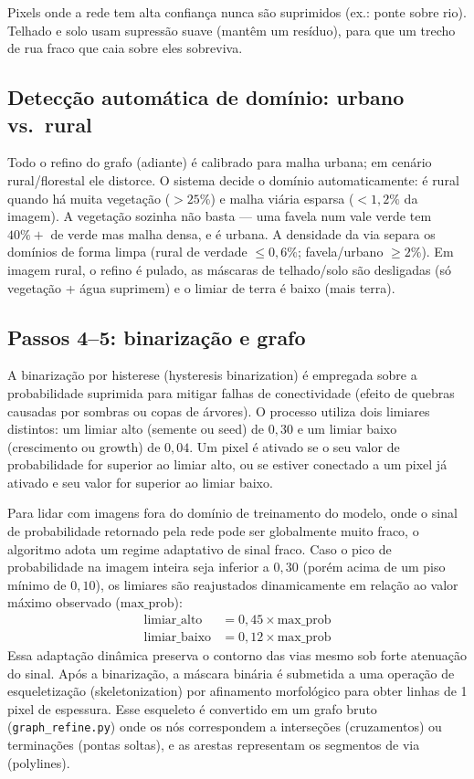 \documentclass[12pt]{article}
\begin{document}
Pixels onde a rede tem alta confiança nunca são suprimidos (ex.: ponte sobre rio). Telhado e solo usam supressão suave (mantêm um resíduo), para que um trecho de rua fraco que caia sobre eles sobreviva.

\subsection{Detecção automática de domínio: urbano vs.\ rural}

Todo o refino do grafo (adiante) é calibrado para malha urbana; em
cenário rural/florestal ele distorce. O sistema decide o domínio
automaticamente: é rural quando há muita vegetação ($>25\%$)
e malha viária esparsa ($<1{,}2\%$ da imagem). A vegetação sozinha não basta
--- uma favela num vale verde tem $40\%+$ de verde mas malha
densa, e é urbana. A densidade da via separa os domínios de forma
limpa (rural de verdade $\le 0{,}6\%$; favela/urbano $\ge 2\%$). Em imagem
rural, o refino é pulado, as máscaras de telhado/solo são desligadas (só
vegetação + água suprimem) e o limiar de terra é baixo (mais terra).

\subsection{Passos 4--5: binarização e grafo}

A binarização por histerese (hysteresis binarization) é empregada sobre a probabilidade suprimida para mitigar falhas de conectividade (efeito de quebras causadas por sombras ou copas de árvores). O processo utiliza dois limiares distintos: um limiar alto (semente ou seed) de $0{,}30$ e um limiar baixo (crescimento ou growth) de $0{,}04$. Um pixel é ativado se o seu valor de probabilidade for superior ao limiar alto, ou se estiver conectado a um pixel já ativado e seu valor for superior ao limiar baixo.

Para lidar com imagens fora do domínio de treinamento do modelo, onde o sinal de probabilidade retornado pela rede pode ser globalmente muito fraco, o algoritmo adota um regime adaptativo de sinal fraco. Caso o pico de probabilidade na imagem inteira seja inferior a $0{,}30$ (porém acima de um piso mínimo de $0{,}10$), os limiares são reajustados dinamicamente em relação ao valor máximo observado ($\text{max\_prob}$):
\begin{align}
\text{limiar\_alto} &= 0{,}45 \times \text{max\_prob} \\
\text{limiar\_baixo} &= 0{,}12 \times \text{max\_prob}
\end{align}
Essa adaptação dinâmica preserva o contorno das vias mesmo sob forte atenuação do sinal. Após a binarização, a máscara binária é submetida a uma operação de esqueletização (skeletonization) por afinamento morfológico para obter linhas de 1 pixel de espessura. Esse esqueleto é convertido em um grafo bruto (\texttt{graph\_refine.py}) onde os nós correspondem a interseções (cruzamentos) ou terminações (pontas soltas), e as arestas representam os segmentos de via (polylines).
\end{document}
